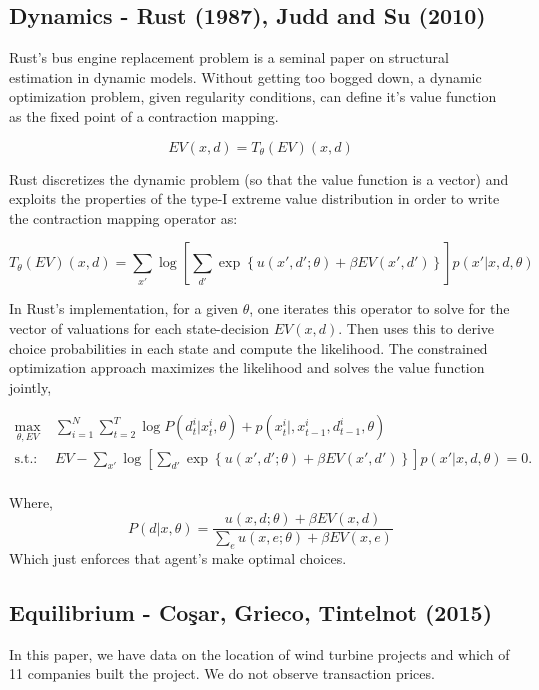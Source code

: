 \documentclass[twoside]{article}
\begin{document}
\subsection{Dynamics - Rust (1987), Judd and Su (2010)}

Rust's bus engine replacement problem is a seminal paper on structural estimation in dynamic models.  Without getting too bogged down, a dynamic optimization problem, given regularity conditions, can define it's value function as the fixed point of a contraction mapping. 

$$ EV(x, d) = T_\theta(EV)(x, d) $$

Rust discretizes the dynamic problem (so that the value function is a vector) and exploits the properties of the type-I extreme value distribution in order to write the contraction mapping operator as: 

$$T_\theta(EV)(x, d) = \sum_{x'} \log \left[ \sum_{d'} \exp \left\{ u(x', d'; \theta) + \beta EV(x', d') \right\} \right] p(x'|x, d, \theta)$$

In Rust's implementation, for a given $\theta$, one iterates this operator to solve for the vector of valuations for each state-decision $EV(x,d)$. Then uses this to derive choice probabilities in each state and compute the likelihood. The constrained optimization approach maximizes the likelihood and solves the value function jointly, 

\begin{align*}
\max_{\theta, EV}~ & \sum_{i=1}^N \sum_{t=2}^T \log P(d_t^i|x_t^i, \theta) + p(x_t^i|, x^i_{t-1}, d^i_{t-1}, \theta) \\
\mbox{s.t.: } & EV -\sum_{x'} \log \left[ \sum_{d'} \exp \left\{ u(x', d'; \theta) + \beta EV(x', d') \right\} \right] p(x'|x, d, \theta) = 0. \\
\end{align*}

Where, 
$$ P(d | x, \theta) = \frac{ u(x, d; \theta) + \beta EV(x, d) }{ \sum_e u(x, e; \theta) + \beta EV(x, e) } $$
Which just enforces that agent's make optimal choices.  

\subsection{Equilibrium - Co\c{s}ar, Grieco, Tintelnot (2015)}

In this paper, we have data on the location of wind turbine projects and which of 11 companies built the project. 
We do not observe transaction prices.  
\end{document}
